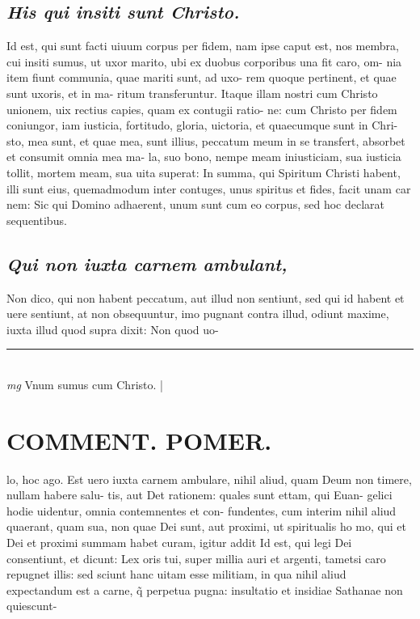 \documentclass{article}
\begin{document}
\begin{pages}
\subsection*{\textit{His qui insiti sunt Christo. }}\pstart Id est, qui sunt facti uiuum corpus per fidem, nam ipse caput est, nos membra, cui insiti sumus, ut uxor marito, ubi ex duobus corporibus una fit caro, om- nia item fiunt communia, quae mariti sunt, ad uxo- rem quoque pertinent, et quae sunt uxoris, et in ma- ritum transferuntur. Itaque illam nostri cum Christo unionem, uix rectius capies, quam ex contugii ratio- ne: cum Christo per fidem coniungor, iam iusticia, fortitudo, gloria, uictoria, et quaecumque sunt in Chri- sto, mea sunt, et quae mea, sunt illius, peccatum meum in se transfert, absorbet et consumit omnia mea ma- la, suo bono, nempe meam iniusticiam, sua iusticia tollit, mortem meam, sua uita superat: In summa, qui Spiritum Christi habent, illi sunt eius, quemadmodum inter contuges, unus spiritus et fides, facit unam car nem: Sic qui Domino adhaerent, unum sunt cum eo corpus, sed hoc declarat sequentibus.   \pend
{}
{}
\subsection*{\textit{Qui non iuxta carnem ambulant, }}\pstart Non dico, qui non habent peccatum, aut illud non sentiunt, sed qui id habent et uere sentiunt, at non obsequuntur, imo pugnant contra illud, odiunt maxime, iuxta illud quod supra dixit: Non quod uo-  \pend
\vspace{0.5cm}\noindent
\vspace{0.2cm}\rule{1cm}{0.2pt}\\ 
\hspace{0.2cm}\textit{mg}
\footnotesize Vnum sumus cum Christo.  
\normalsize| 
\section*{COMMENT. POMER.  }\pstart lo, hoc ago. Est uero iuxta carnem ambulare, nihil aliud, quam Deum non timere, nullam habere salu- tis, aut Det rationem: quales sunt ettam, qui Euan- gelici hodie uidentur, omnia contemnentes et con- fundentes, cum interim nihil aliud quaerant, quam sua, non quae Dei sunt, aut proximi, ut spiritualis ho mo, qui et Dei et proximi summam habet curam, igitur addit  \pend\pstart Id est, qui legi Dei consentiunt, et dicunt: Lex oris tui, super millia auri et argenti, tametsi caro repugnet illis: sed sciunt hanc uitam esse militiam, in qua nihil aliud expectandum est a carne, q̃ perpetua pugna: insultatio et insidiae Sathanae non quiescunt-  \pend
{}
{}

\end{pages}
\end{document}
